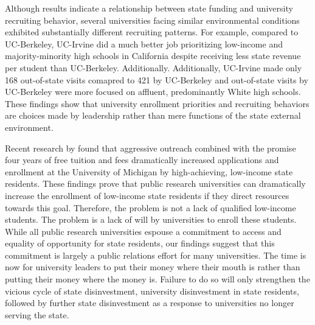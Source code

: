 \documentclass[twoside]{article}
\begin{document}
Although results indicate a relationship between state funding and university recruiting behavior, several universities facing similar environmental conditions exhibited substantially different recruiting patterns. For example, compared to UC-Berkeley, UC-Irvine did a much better job prioritizing low-income and majority-minority high schools in California despite receiving less state revenue per student than UC-Berkeley. Additionally.  Additionally, UC-Irvine made only 168 out-of-state visits comapred to 421 by UC-Berkeley and out-of-state visits by UC-Berkeley were more focused on affluent, predominantly White high schools.  These findings show that university enrollment priorities and recruiting behaviors are choices made by leadership rather than mere functions of the state external environment. 

Recent research by \cite{RN4408} found that aggressive outreach combined with the promise four years of free tuition and fees dramatically increased applications and enrollment at the University of Michigan by high-achieving, low-income state residents.  These findings prove that public research universities can dramatically increase the enrollment of low-income state residents if they direct resources towards this goal. Therefore, the problem is not a lack of qualified low-income students. The problem is a lack of will by universities to enroll these students. While all public research universities espouse a commitment to access and equality of opportunity for state residents, our findings suggest that this commitment is largely a public relations effort for many universities. The time is now for university leaders to put their money where their mouth is rather than putting their money where the money is.  Failure to do so will only strengthen the vicious cycle of state disinvestment, university disinvestment in state residents, followed by further state disinvestment as a response to universities no longer serving the state.
\end{document}
